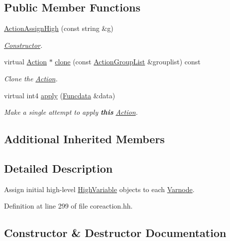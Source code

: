 \subsection*{Public Member Functions}
\begin{DoxyCompactItemize}
\item 
\mbox{\hyperlink{class_action_assign_high_afdf83f563f000106561b4e9662430c8a}{Action\+Assign\+High}} (const string \&g)
\begin{DoxyCompactList}\small\item\em \mbox{\hyperlink{class_constructor}{Constructor}}. \end{DoxyCompactList}\item 
virtual \mbox{\hyperlink{class_action}{Action}} $\ast$ \mbox{\hyperlink{class_action_assign_high_aeb37b16d8fa8f7393f39c7d2c38b8da9}{clone}} (const \mbox{\hyperlink{class_action_group_list}{Action\+Group\+List}} \&grouplist) const
\begin{DoxyCompactList}\small\item\em Clone the \mbox{\hyperlink{class_action}{Action}}. \end{DoxyCompactList}\item 
virtual int4 \mbox{\hyperlink{class_action_assign_high_aa0e3cd08123d3a5b60f0f0c35468b5ae}{apply}} (\mbox{\hyperlink{class_funcdata}{Funcdata}} \&data)
\begin{DoxyCompactList}\small\item\em Make a single attempt to apply {\bfseries{this}} \mbox{\hyperlink{class_action}{Action}}. \end{DoxyCompactList}\end{DoxyCompactItemize}
\subsection*{Additional Inherited Members}


\subsection{Detailed Description}
Assign initial high-\/level \mbox{\hyperlink{class_high_variable}{High\+Variable}} objects to each \mbox{\hyperlink{class_varnode}{Varnode}}. 

Definition at line 299 of file coreaction.\+hh.



\subsection{Constructor \& Destructor Documentation}
\mbox{\label{class_action_assign_high_afdf83f563f000106561b4e9662430c8a}} 
